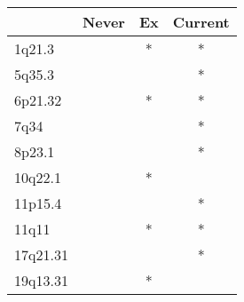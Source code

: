 \begin{tabular}{lccc}
\toprule
{} & Never & Ex & Current \\
\midrule
1q21.3   &       &  * &       * \\
5q35.3   &       &    &       * \\
6p21.32  &       &  * &       * \\
7q34     &       &    &       * \\
8p23.1   &       &    &       * \\
10q22.1  &       &  * &         \\
11p15.4  &       &    &       * \\
11q11    &       &  * &       * \\
17q21.31 &       &    &       * \\
19q13.31 &       &  * &         \\
\bottomrule
\end{tabular}
